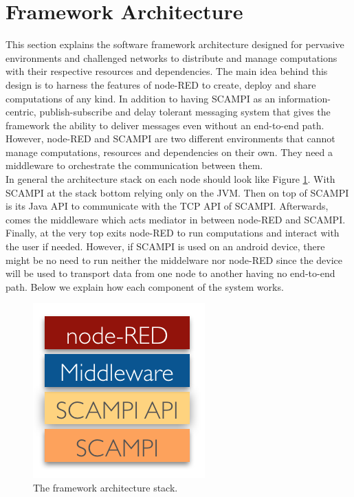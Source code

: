 \section{Framework Architecture}\label{sec:design}
This section explains the software framework architecture designed for pervasive environments and challenged networks to distribute and manage computations with their respective resources and dependencies.  The main idea behind this design is to harness the features of node-RED to create, deploy and share computations of any kind. In addition to having SCAMPI as an information-centric, publish-subscribe and delay tolerant messaging system that gives the framework the ability to deliver messages even without an end-to-end path. However, node-RED and SCAMPI are two different environments that cannot manage computations, resources and dependencies on their own. They need a middleware to orchestrate the communication between them.\\


\noindent In general the architecture stack on each node should look like Figure \ref{fig:stack}. With SCAMPI at the stack bottom relying only on the JVM. Then on top of SCAMPI is its Java API to communicate with the TCP API of SCAMPI. Afterwards, comes the middleware which acts mediator in between node-RED and SCAMPI. Finally, at the very top exits node-RED to run computations and interact with the user if needed. However, if SCAMPI is used on an android device, there might be no need to run neither the middelware nor node-RED since the device will be  used to transport data from one node to another having no end-to-end path. Below we explain how each component of the system works.
\begin{figure}[H]
	\centering
	\includegraphics[scale=0.8]{images/stack.png}
	\caption{The framework architecture stack.  }
	\label{fig:stack}
\end{figure}



